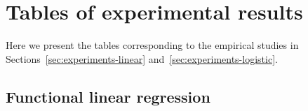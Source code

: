 %
%

\setlength{\voffset}{-.5cm}
\setlength{\footskip}{80pt}

\chapter{Tables of experimental results}\label{ch:tables}

\enlargethispage{10\baselineskip}

Here we present the tables corresponding to the empirical studies in Sections~\ref{sec:experiments-linear} and~\ref{sec:experiments-logistic}.

\section*{Functional linear regression}

